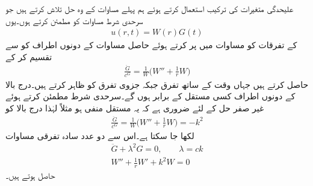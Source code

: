  \quad علیحدگی متغیرات کی ترکیب استعمال کرتے ہوئے ہم پہلے مساوات  کے وہ حل تلاش کرتے ہیں جو سرحدی شرط مساوات  کو مطمئن کرتے ہوں۔یوں
\begin{align}\label{مساوات_جزوی_دائری_جھلی_ٹ}
u(r,t)=W(r)G(t)
\end{align}
کے تفرقات کو مساوات  میں پر کرتے ہوئے حاصل مساوات کے دونوں اطراف کو  سے تقسیم کر کے
\begin{align*}
\frac{\ddot{G}}{c^G}=\frac{1}{W}\big(W''+\frac{1}{r}W\big)
\end{align*}
حاصل کرتے ہیں جہاں  وقت  کے ساتھ تفرق جبکہ  جزوی تفرق کو ظاہر کرتے ہیں۔درج بالا کے دونوں اطراف کسی مستقل کے برابر ہوں گے۔سرحدی شرط مطمئن کرتے ہوئے غیر صفر حل کے لئے ضروری ہے کہ یہ مستقل منفی ہو مثلاً  لہٰذا درج بالا کو 
\begin{align*}
\frac{\ddot{G}}{c^G}=\frac{1}{W}\big(W''+\frac{1}{r}W\big)=-k^2
\end{align*}
لکھا جا سکتا ہے۔اس سے دو عدد سادہ تفرقی مساوات
\begin{align}
\ddot{G}+\lambda^2G=0,\quad \quad \lambda=ck\label{مساوات_جزوی_دائری_جھلی_ث}\\
W''+\frac{1}{r}W'+k^2W=0\label{مساوات_جزوی_دائری_جھلی_ج}
\end{align}
حاصل ہوتے ہیں۔


